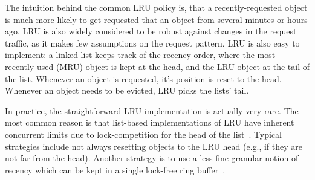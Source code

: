 \documentclass{article}
\begin{document}
The intuition behind the common LRU policy is, that a recently-requested object is much more likely to get requested that an object from several minutes or hours ago.
LRU is also widely considered to be robust against changes in the request traffic, as it makes few assumptions on the request pattern.
LRU is also easy to implement: a linked list keeps track of the recency order, where the most-recently-used (MRU) object is kept at the head, and the LRU object at the tail of the list.
Whenever an object is requested, it's position is reset to the head.
Whenever an object needs to be evicted, LRU picks the lists' tail.

In practice, the straightforward LRU implementation is actually very rare.
The most common reason is that list-based implementations of LRU have inherent concurrent limits due to lock-competition for the head of the list~\cite{li2015architecting,lim2014mica,fan2013memc3}.
Typical strategies include not always resetting objects to the LRU head (e.g., if they are not far from the head).
Another strategy is to use a less-fine granular notion of recency which can be kept in a single lock-free ring buffer~\cite{fan2013memc3}.
\end{document}
